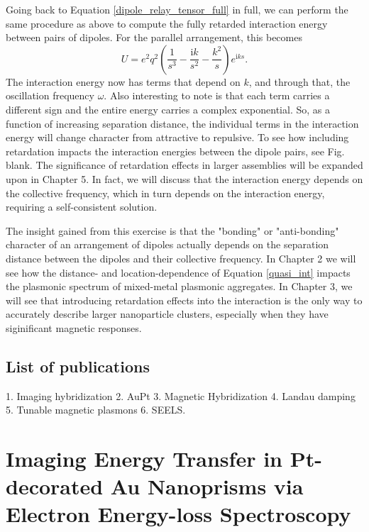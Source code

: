 \documentclass [11pt, proquest] {uwthesis}[2016/11/22]
\begin{document}
Going back to Equation \ref{dipole_relay_tensor_full} in full, we can perform the same procedure as above to compute the fully retarded interaction energy between pairs of dipoles. For the parallel arrangement, this becomes
\begin{equation}
U = e^2q^2\left(\frac{1}{s^3}-\frac{\textrm{i}k}{s^2}-\frac{k^2}{s}\right)e^{\textrm{i}ks}.
\label{int_ret}
\end{equation}
The interaction energy now has terms that depend on $k$, and through that, the oscillation frequency $\omega$. Also interesting to note is that each term carries a different sign and the entire energy carries a complex exponential. So, as a function of increasing separation distance, the individual terms in the interaction energy will change character from attractive to repulsive. To see how including retardation impacts the interaction energies between the dipole pairs, see Fig. blank. The significance of retardation effects in larger assemblies will be expanded upon in Chapter 5. In fact, we will discuss that the interaction energy depends on the collective frequency, which in turn depends on the interaction energy, requiring a self-consistent solution.

The insight gained from this exercise is that the "bonding" or "anti-bonding" character of an arrangement of dipoles actually depends on the separation distance between the dipoles and their collective frequency. In Chapter 2 we will see how the distance- and location-dependence of Equation \ref{quasi_int} impacts the plasmonic spectrum of mixed-metal plasmonic aggregates. In Chapter 3, we will see that introducing retardation effects into the interaction is the only way to accurately describe larger nanoparticle clusters, especially when they have siginificant magnetic responses.

\section{List of publications}

1. Imaging hybridization
2. AuPt
3. Magnetic Hybridization 
4. Landau damping
5. Tunable magnetic plasmons
6. SEELS.
 
\chapter{Imaging Energy Transfer in Pt-decorated Au Nanoprisms via Electron Energy-loss Spectroscopy}
\end{document}
